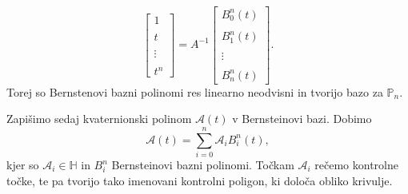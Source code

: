 \documentclass[mat1]{fmfdelo}
\newcommand{\HH}{\mathbb H}
\newcommand{\A}{\mathcal A}
\newcommand{\B}{\mathcal B}
\begin{document}
\begin{dokaz}
\begin{equation*}
\begin{bmatrix}
		1 \\   \\  t \\ \\ \vdots \\ \\ t^n
		\end{bmatrix}
		= A^{-1}
		\begin{bmatrix}
		B_0^n(t) \\ \\B_1^n(t) \\ \\ \vdots \\ \\ B_n^n(t)
		\end{bmatrix}.		
	\end{equation*}
	Torej so Bernstenovi bazni polinomi res linearno neodvisni in tvorijo bazo za $\mathbb{P}_n$.
\end{dokaz}

Zapišimo sedaj kvaternionski polinom $\A(t)$ v Bernsteinovi bazi. Dobimo
\begin{equation*}
\A(t) = \sum_{i=0}^n \A_i B_i^n(t),
\end{equation*}
kjer so $\A_i \in \HH$ in $B_i^n$ Bernsteinovi bazni polinomi. Točkam $\A_i$ rečemo kontrolne točke, te pa tvorijo tako imenovani kontrolni poligon, ki določa obliko krivulje.
\end{document}
